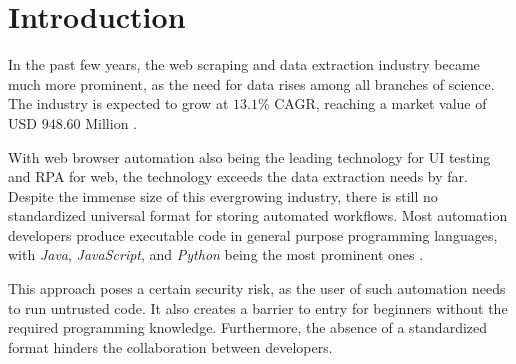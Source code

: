 \chapter*{Introduction}


In the past few years, the web scraping and data extraction industry became much more prominent, as the need for data rises among all branches of science. 
The industry is expected to grow at $13.1\%$ CAGR, reaching a market value of USD $948.60$ Million .
\par
With web browser automation also being the leading technology for UI testing and \ac{RPA} for web, the technology exceeds the data extraction needs by far.
Despite the immense size of this evergrowing industry, there is still no standardized universal format for storing automated workflows. 
Most automation developers produce executable code in general purpose programming languages, with \textit{Java}, \textit{JavaScript}, and \textit{Python} being the most prominent ones .
\par
This approach poses a certain security risk, as the user of such automation needs to run untrusted code. 
It also creates a barrier to entry for beginners without the required programming knowledge. 
Furthermore, the absence of a standardized format hinders the collaboration between developers.

